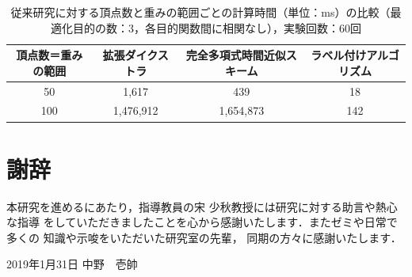\documentclass[12pt]{optlab-bachelor}
\def\氏名{中野　壱帥}
\begin{document}
\begin{table}[h]
  \centering
  \caption{従来研究に対する頂点数と重みの範囲ごとの計算時間（単位：ms）の比較（最適化目的の数：3，各目的関数間に相関なし），実験回数：60回}
  {\small
  \begin{tabular}{|c|c|c|c|} \hline
    頂点数＝重みの範囲 & 拡張ダイクストラ & 完全多項式時間近似スキーム & ラベル付けアルゴリズム \\ \hline
    50 & 1,617 & 439 & 18 \\ \hline
    100 & 1,476,912 & 1,654,873 & 142 \\ \hline
  \end{tabular}
  }
\end{table}


\chapter*{謝辞}
本研究を進めるにあたり，指導教員の宋 少秋教授には研究に対する助言や熱心な指導
をしていただきましたことを心から感謝いたします．またゼミや日常で多くの
知識や示唆をいただいた研究室の先輩，
同期の方々に感謝いたします．

\begin{flushright}
  2019年1月31日 \氏名
\end{flushright}
\endmatter %
\end{document}
